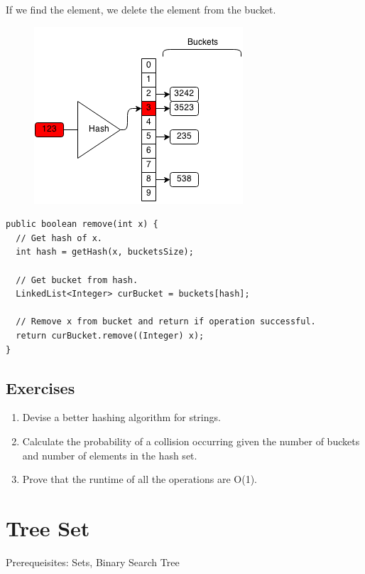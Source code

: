 \documentclass[11pt,oneside]{book}
\makeatletter
\def\maxwidth#1{\ifdim\Gin@nat@width>#1 #1\else\Gin@nat@width\fi}
\makeatother
\begin{document}
If we find the element, we delete the element from the bucket.

\vspace{5px}\begin{figure}[H]\centering
        \includegraphics[width=0.66\maxwidth{\textwidth}]{hashsetrem3.png}
        \end{figure}

\begin{lstlisting}
public boolean remove(int x) {
  // Get hash of x.
  int hash = getHash(x, bucketsSize);
  
  // Get bucket from hash.
  LinkedList<Integer> curBucket = buckets[hash];
  
  // Remove x from bucket and return if operation successful.
  return curBucket.remove((Integer) x);
}
\end{lstlisting}

\subsection{Exercises}

\begin{enumerate}
\item Devise a better hashing algorithm for strings.
\item Calculate the probability of a collision occurring given the number of buckets and number of elements in the hash set.
\item Prove that the runtime of all the operations are O(1).
\end{enumerate}

        \section{ Tree Set }
        

Prerequeisites: Sets, Binary Search Tree
\end{document}
